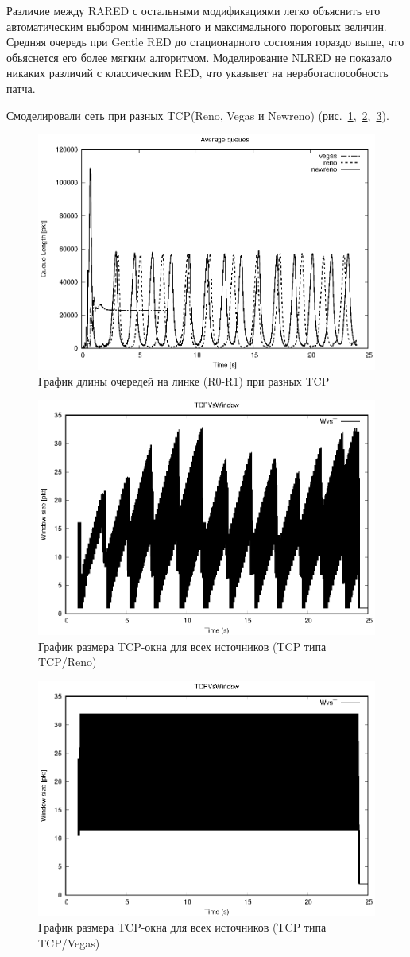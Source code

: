 Различие между RARED с остальными модификациями легко объяснить его
автоматическим выбором минимального и максимального пороговых
величин. Средняя очередь при Gentle RED до стационарного состояния
гораздо выше, что обьяснется его более мягким
алгоритмом. Моделирование NLRED не показало никаких различий с
классическим RED, что указывет на неработаспособность патча.

Смоделировали сеть при разных TCP(Reno, Vegas и Newreno)
(рис.~\ref{fig:3.7},~\ref{fig:3.8},~\ref{fig:3.9}).

\begin{figure}[!ht]
  \centering
  \includegraphics[width=0.6\linewidth]{image/av_queues_tcp.eps}
  \caption{График длины очередей на линке (R0-R1) при разных TCP}
  \label{fig:3.7}
\end{figure}

\begin{figure}[!ht]
  \centering
  \includegraphics[width=0.6\linewidth]{image/TCP_75-150_classic.eps}
  \caption{График размера TCP-окна для всех источников (TCP типа TCP/Reno)}
  \label{fig:3.8}
\end{figure}

\begin{figure}[!ht]
  \centering
  \includegraphics[width=0.6\linewidth]{image/TCP_vegas.eps}
  \caption{График размера TCP-окна для всех источников (TCP типа TCP/Vegas)}
  \label{fig:3.9}
\end{figure}

